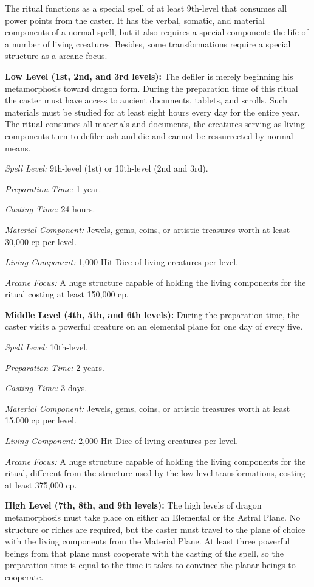 {The ritual functions as a special spell of at least 9th-level that consumes all power points from the caster. It has the verbal, somatic, and material components of a normal spell, but it also requires a special component: the life of a number of living creatures. Besides, some transformations require a special structure as a arcane focus.

\textbf{Low Level (1st, 2nd, and 3rd levels):} The defiler is merely beginning his metamorphosis toward dragon form. During the preparation time of this ritual the caster must have access to ancient documents, tablets, and scrolls. Such materials must be studied for at least eight hours every day for the entire year. The ritual consumes all materials and documents, the creatures serving as living components turn to defiler ash and die and cannot be ressurrected by normal means.

\textit{Spell Level:} 9th-level (1st) or 10th-level (2nd and 3rd).

\textit{Preparation Time:} 1 year.

\textit{Casting Time:} 24 hours.

\textit{Material Component:} Jewels, gems, coins, or artistic treasures worth at least 30,000 cp per level.

\textit{Living Component:} 1,000 Hit Dice of living creatures per level.

\textit{Arcane Focus:} A huge structure capable of holding the living components for the ritual costing at least 150,000 cp.

\textbf{Middle Level (4th, 5th, and 6th levels):} During the preparation time, the caster visits a powerful creature on an elemental plane for one day of every five.

\textit{Spell Level:} 10th-level.

\textit{Preparation Time:} 2 years.

\textit{Casting Time:} 3 days.

\textit{Material Component:} Jewels, gems, coins, or artistic treasures worth at least 15,000 cp per level.

\textit{Living Component:} 2,000 Hit Dice of living creatures per level.

\textit{Arcane Focus:} A huge structure capable of holding the living components for the ritual, different from the structure used by the low level transformations, costing at least 375,000 cp.

\textbf{High Level (7th, 8th, and 9th levels):} The high levels of dragon metamorphosis must take place on either an Elemental or the Astral Plane. No structure or riches are required, but the caster must travel to the plane of choice with the living components from the Material Plane. At least three powerful beings from that plane must cooperate with the casting of the spell, so the preparation time is equal to the time it takes to convince the planar beings to cooperate.

}
